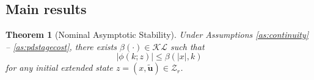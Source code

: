 \documentclass{article}
\newtheorem{theorem}{Theorem}
\newtheorem{lemma}{Lemma}
\newcommand{\abs}[1]{\left\lvert #1 \right\rvert}
\begin{document}
\subsection{Main results}
\begin{theorem}[Nominal Asymptotic Stability]
\label{th:nominalstability}
Under Assumptions \ref{as:continuity} -- \ref{as:pdstagecost}, there exists
$\beta(\cdot) \in \mathcal{KL}$ such that 
\begin{equation*}
\abs{\phi(k;z)} \leq \beta(\abs{x},k)
\end{equation*}
for any initial extended state $z = (x,\tilde{\mathbf{u}}) \in \mathcal{Z}_r$.
\end{theorem}
\end{document}
